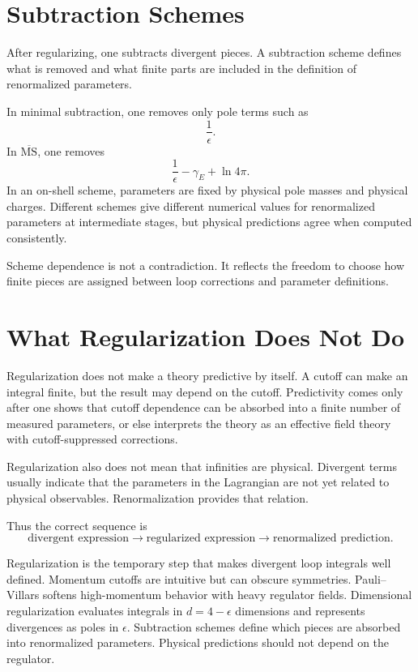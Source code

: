 \section{Subtraction Schemes}

After regularizing, one subtracts divergent pieces. A subtraction scheme defines
what is removed and what finite parts are included in the definition of
renormalized parameters.

In minimal subtraction, one removes only pole terms such as
\[
    \frac{1}{\epsilon}.
\]
In \(\overline{\mathrm{MS}}\), one removes
\[
    \frac{1}{\epsilon}-\gamma_E+\ln4\pi.
\]
In an on-shell scheme, parameters are fixed by physical pole masses and physical
charges. Different schemes give different numerical values for renormalized
parameters at intermediate stages, but physical predictions agree when computed
consistently.

Scheme dependence is not a contradiction. It reflects the freedom to choose how
finite pieces are assigned between loop corrections and parameter definitions.

\section{What Regularization Does Not Do}

Regularization does not make a theory predictive by itself. A cutoff can make an
integral finite, but the result may depend on the cutoff. Predictivity comes only
after one shows that cutoff dependence can be absorbed into a finite number of
measured parameters, or else interprets the theory as an effective field theory
with cutoff-suppressed corrections.

Regularization also does not mean that infinities are physical. Divergent terms
usually indicate that the parameters in the Lagrangian are not yet related to
physical observables. Renormalization provides that relation.

Thus the correct sequence is
\[
    \text{divergent expression}
    \longrightarrow
    \text{regularized expression}
    \longrightarrow
    \text{renormalized prediction}.
\]

\begin{summarybox}
Regularization is the temporary step that makes divergent loop integrals well
defined. Momentum cutoffs are intuitive but can obscure symmetries.
Pauli--Villars softens high-momentum behavior with heavy regulator fields.
Dimensional regularization evaluates integrals in \(d=4-\epsilon\) dimensions and
represents divergences as poles in \(\epsilon\). Subtraction schemes define which
pieces are absorbed into renormalized parameters. Physical predictions should not
depend on the regulator.
\end{summarybox}

